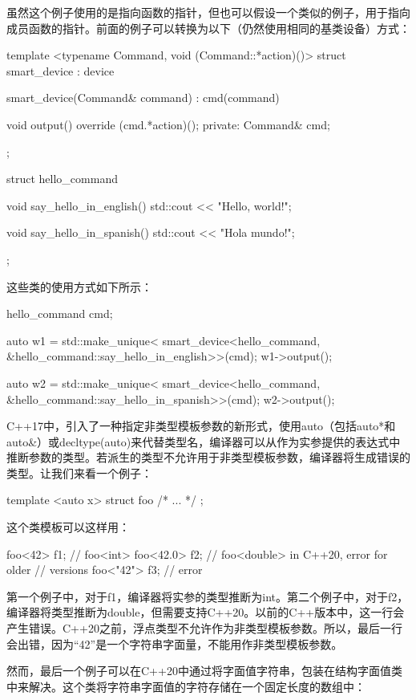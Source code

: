 虽然这个例子使用的是指向函数的指针，但也可以假设一个类似的例子，用于指向成员函数的指针。前面的例子可以转换为以下（仍然使用相同的基类设备）方式：

\begin{cpp}
template <typename Command, void (Command::*action)()>
struct smart_device : device
{
	smart_device(Command& command) : cmd(command) {}
	
	void output() override
	{
		(cmd.*action)();
	}
private:
	Command& cmd;
};

struct hello_command
{
	void say_hello_in_english()
	{
		std::cout << "Hello, world!\n";
	}

	void say_hello_in_spanish()
	{
		std::cout << "Hola mundo!\n";
	}
};
\end{cpp}

这些类的使用方式如下所示：

\begin{cpp}
hello_command cmd;

auto w1 = std::make_unique<
	smart_device<hello_command,
		&hello_command::say_hello_in_english>>(cmd);
w1->output();

auto w2 = std::make_unique<
	smart_device<hello_command,
		&hello_command::say_hello_in_spanish>>(cmd);
w2->output();
\end{cpp}

C++17中，引入了一种指定非类型模板参数的新形式，使用auto（包括auto*和auto\&）或decltype(auto)来代替类型名，编译器可以从作为实参提供的表达式中推断参数的类型。若派生的类型不允许用于非类型模板参数，编译器将生成错误的类型。让我们来看一个例子：

\begin{cpp}
template <auto x>
struct foo
{ /* ... */ };
\end{cpp}

这个类模板可以这样用：

\begin{cpp}
foo<42> f1;   // foo<int>
foo<42.0> f2; // foo<double> in C++20, error for older
              // versions
foo<"42"> f3; // error
\end{cpp}

第一个例子中，对于f1，编译器将实参的类型推断为int。第二个例子中，对于f2，编译器将类型推断为double，但需要支持C++20。以前的C++版本中，这一行会产生错误。C++20之前，浮点类型不允许作为非类型模板参数。所以，最后一行会出错，因为“42”是一个字符串字面量，不能用作非类型模板参数。

然而，最后一个例子可以在C++20中通过将字面值字符串，包装在结构字面值类中来解决。这个类将字符串字面值的字符存储在一个固定长度的数组中：

